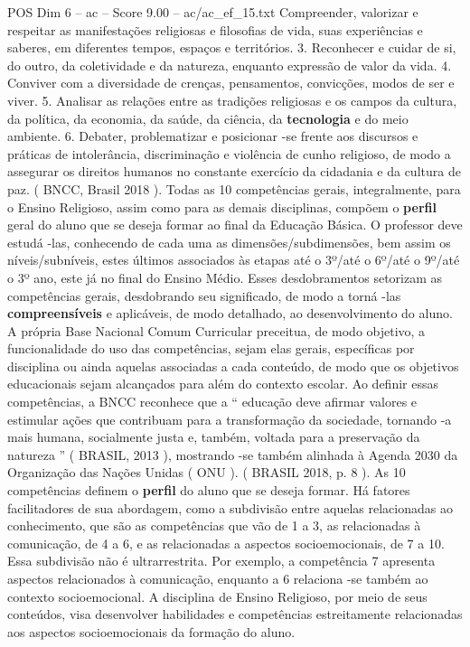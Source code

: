 \begin{textsample}{POS Dim 6 – ac – Score 9.00 – ac/ac\_ef\_15.txt}
Compreender, valorizar e respeitar as manifestações religiosas e filosofias de vida, suas experiências e saberes, em diferentes tempos, espaços e territórios. 3.
Reconhecer e cuidar de si, do outro, da coletividade e da natureza, enquanto expressão de valor da vida. 4.
Conviver com a diversidade de crenças, pensamentos, convicções, modos de ser e viver. 5.
Analisar as relações entre as tradições religiosas e os campos da cultura, da política, da economia, da saúde, da ciência, da \textbf{tecnologia} e do meio ambiente. 6.
Debater, problematizar e posicionar -se frente aos discursos e práticas de intolerância, discriminação e violência de cunho religioso, de modo a assegurar os direitos humanos no constante exercício da cidadania e da cultura de paz. ( BNCC, Brasil 2018 ).
Todas as 10 competências gerais, integralmente, para o Ensino Religioso, assim como para as demais disciplinas, compõem o \textbf{perfil} geral do aluno que se deseja formar ao final da Educação Básica.
O professor deve estudá -las, conhecendo de cada uma as dimensões/subdimensões, bem assim os níveis/subníveis, estes últimos associados às etapas até o 3º/até o 6º/até o 9º/até o 3º ano, este já no final do Ensino Médio.
Esses desdobramentos setorizam as competências gerais, desdobrando seu significado, de modo a torná -las \textbf{compreensíveis} e aplicáveis, de modo detalhado, ao desenvolvimento do aluno.
A própria Base Nacional Comum Curricular preceitua, de modo objetivo, a funcionalidade do uso das competências, sejam elas gerais, específicas por disciplina ou ainda aquelas associadas a cada conteúdo, de modo que os objetivos educacionais sejam alcançados para além do contexto escolar.
Ao definir essas competências, a BNCC reconhece que a “ educação deve afirmar valores e estimular ações que contribuam para a transformação da sociedade, tornando -a mais humana, socialmente justa e, também, voltada para a preservação da natureza ” ( BRASIL, 2013 ), mostrando -se também alinhada à Agenda 2030 da Organização das Nações Unidas ( ONU ). ( BRASIL 2018, p. 8 ).
As 10 competências definem o \textbf{perfil} do aluno que se deseja formar.
Há fatores facilitadores de sua abordagem, como a subdivisão entre aquelas relacionadas ao conhecimento, que são as competências que vão de 1 a 3, as relacionadas à comunicação, de 4 a 6, e as relacionadas a aspectos socioemocionais, de 7 a 10.
Essa subdivisão não é ultrarrestrita.
Por exemplo, a competência 7 apresenta aspectos relacionados à comunicação, enquanto a 6 relaciona -se também ao contexto socioemocional.
A disciplina de Ensino Religioso, por meio de seus conteúdos, visa desenvolver habilidades e competências estreitamente relacionadas aos aspectos socioemocionais da formação do aluno.

\end{textsample}
